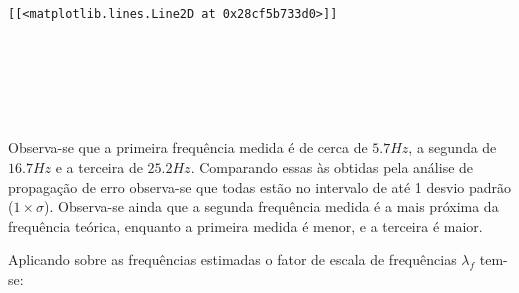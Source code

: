             \begin{tcolorbox}[breakable, size=fbox, boxrule=.5pt, pad at break*=1mm, opacityfill=0]
\begin{Verbatim}[commandchars=\\\{\}]
[[<matplotlib.lines.Line2D at 0x28cf5b733d0>]]
\end{Verbatim}
\end{tcolorbox}
        
    \begin{center}
    \end{center}
    { \hspace*{\fill} \\}
    
    \begin{center}
    \end{center}
    { \hspace*{\fill} \\}
    
    \begin{center}
    \end{center}
    { \hspace*{\fill} \\}
    
    Observa-se que a primeira frequência medida é de cerca de \(5.7 Hz\), a
segunda de \(16.7 Hz\) e a terceira de \(25.2 Hz\). Comparando essas às
obtidas pela análise de propagação de erro observa-se que todas estão no
intervalo de até 1 desvio padrão (\(1\times\sigma\)). Observa-se ainda
que a segunda frequência medida é a mais próxima da frequência teórica,
enquanto a primeira medida é menor, e a terceira é maior.

    Aplicando sobre as frequências estimadas o fator de escala de
frequências \(\lambda_f\) tem-se:

